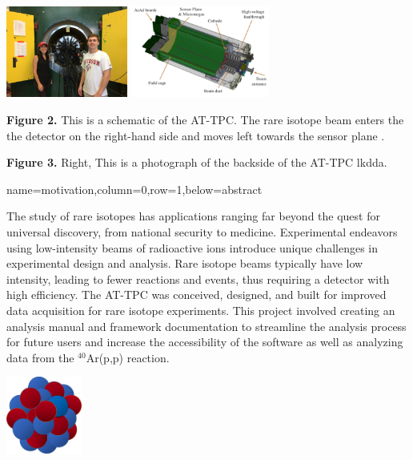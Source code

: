 \documentclass[ansiepaper,portrait]{baposter}
\begin{document}
\begin{poster}
{\begin{center}
\includegraphics [height=30mm]{michigan_trip.jpg} 
\hspace{0.2cm}
\includegraphics [height=30mm] {attpc.png}
\end{center}

\small{\textbf{Figure 2.} This is a schematic of the AT-TPC. The rare isotope beam enters the the detector on the right-hand side and moves left towards the sensor plane \cite{Bradt-thesis}.}


\small{\textbf{Figure 3.} Right, This is a photograph of the backside of the AT-TPC lkdda.}

}
{name=motivation,column=0,row=1,below=abstract}
{\small{The study of rare isotopes has applications ranging far beyond the quest for universal discovery, from national security to medicine. Experimental endeavors using low-intensity beams of radioactive ions introduce unique challenges in experimental design and analysis. Rare isotope beams typically have low intensity, leading to fewer reactions and events, thus requiring a detector with high efficiency. The AT-TPC was conceived, designed, and built for improved data acquisition for rare isotope experiments. 
This project involved creating an analysis manual and framework documentation to streamline the analysis process for future users and increase the accessibility of the software as well as analyzing data from the $^{40}$Ar(p,p) reaction.}

\begin{center}
\includegraphics[width=25mm]{ar40_nucleus.png}
\end{center}

}
\end{poster}
\end{document}
